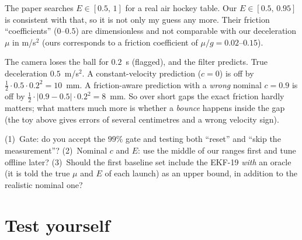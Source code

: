 \documentclass[11pt,a4paper]{article}
\begin{document}
\begin{ours}
The paper searches $E\in[0.5,\,1]$ for a real air hockey table. Our $E\in[0.5,\,0.95]$ is consistent
with that, so it is not only my guess any more. Their friction ``coefficients'' ($0$--$0.5$) are
dimensionless and not comparable with our deceleration $\mu$ in m/s$^2$ (ours corresponds to a
friction coefficient of $\mu/g=0.02$--$0.15$).
\end{ours}

\begin{toy}
The camera loses the ball for $0.2$~s (flagged), and the filter predicts. True deceleration
$0.5$~m/s$^2$. A constant-velocity prediction ($c=0$) is off by $\tfrac12\cdot0.5\cdot0.2^2=10$~mm. A
friction-aware prediction with a \emph{wrong} nominal $c=0.9$ is off by
$\tfrac12\cdot|0.9-0.5|\cdot0.2^2=8$~mm. So over short gaps the exact friction hardly matters; what
matters much more is whether a \emph{bounce} happens inside the gap (the toy above gives errors of
several centimetres and a wrong velocity sign).
\end{toy}

\begin{eqbox}
(1)~Gate: do you accept the $99\%$ gate and testing both ``reset'' and ``skip the measurement''?
(2)~Nominal $c$ and $E$: use the middle of our ranges first and tune offline later?
(3)~Should the first baseline set include the EKF-19 \emph{with} an oracle (it is told the true
$\mu$ and $E$ of each launch) as an upper bound, in addition to the realistic nominal one?
\end{eqbox}

\section{Test yourself}
\end{document}
